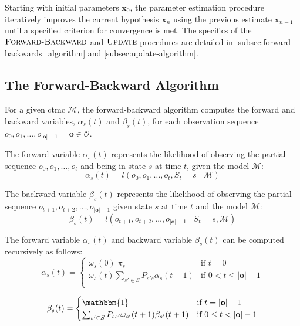 Starting with initial parameters $\mathbf{x}_0$, the parameter estimation procedure iteratively improves the current hypothesis $\mathbf{x}_n$ using the previous estimate $\mathbf{x}_{n-1}$ until a specified criterion for convergence is met. The specifics of the $\textnormal{\scshape Forward-Backward}$ and $\textnormal{\scshape Update}$ procedures are detailed in \autoref{subsec:forward-backwards_algorithm} and \autoref{subsec:update-algorithm}.

\subsection{The Forward-Backward Algorithm}\label{subsec:forward-backwards_algorithm}
For a given \gls{ctmc} $\mathcal{M}$, the forward-backward algorithm computes the forward and backward variables, $\alpha_s(t)$ and $\beta_s(t)$, for each observation sequence $o_0, o_1, \dots, o_{|\mathbf{o}|-1} = \mathbf{o} \in \mathcal{O}$.

The forward variable $\alpha_s(t)$ represents the likelihood of observing the partial sequence $o_0, o_1, \dots, o_t$ and being in state $s$ at time $t$, given the model $\mathcal{M}$: 
\begin{equation} 
    \alpha_s(t) = l(o_0, o_1, \dots, o_t, S_{t} = s \mid \mathcal{M})
    \label{eq:equation6} 
\end{equation}

The backward variable $\beta_s(t)$ represents the likelihood of observing the partial sequence $o_{t+1}, o_{t+2}, \dots, o_{|\mathbf{o}|-1}$ given state $s$ at time $t$ and the model $\mathcal{M}$: 
\begin{equation} 
    \beta_s(t) = l(o_{t+1}, o_{t+2}, \dots, o_{|\mathbf{o}|-1} \mid S_{t} = s, \mathcal{M})
    \label{eq:equation7} 
\end{equation}

The forward variable $\alpha_s(t)$ and backward variable $\beta_s(t)$ can be computed recursively as follows: 
\begin{equation} 
    \alpha_s(t) = 
    \begin{cases} 
        \omega_s(0) \; \pi_s & \text{if } t = 0 \\ 
        \omega_s(t) \sum_{s' \in S} P_{s's}\alpha_s(t - 1) & \text{if } 0 < t \leq |\mathbf{o}| - 1 \\ 
    \end{cases}
    \label{eq:equation8} 
\end{equation} 

\begin{equation} 
    \beta_s(t) = 
    \begin{cases} \mathbbm{1} & \text{if } t = |\mathbf{o}| - 1 \\ 
        \sum_{s' \in S} P_{ss'} \omega_{s'}(t + 1) \beta_{s'}(t + 1) & \text{if } 0 \leq t < |\mathbf{o}| - 1 \\ 
    \end{cases}
    \label{eq:equation9} 
\end{equation}


